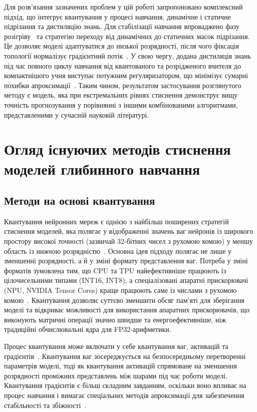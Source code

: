 \documentclass{pma-mthesis}
\begin{document}
Для розв’язання зазначених проблем у цій роботі запропоновано комплексний підхід, що інтегрує квантування у процесі навчання, динамічне і статичне підрізання та дистиляцію знань. Для стабілізації навчання впроваджено фазу розігріву~\cite{krishnamoorthi2018quantizing} та стратегію переходу від динамічних до статичних масок підрізання. Це дозволяє моделі адаптуватися до низької розрядності, після чого фіксація топології нормалізує градієнтний потік~\cite{10946020}. У свою чергу, додана дистиляція знань під час повного циклу навчання від квантованого та розрідженого вчителя до компактнішого учня виступає потужним регуляризатором, що мінімізує сумарні похибки апроксимації~\cite{kim2021pqk}. Таким чином, результатом застосування розглянутого методу є модель, яка при екстремальних рівнях стиснення демонструє вищу точність прогнозування у порівнянні з іншими комбінованими алгоритмами, представленими у сучасній науковій літературі.

\chapter{Огляд існуючих методів стиснення моделей глибинного навчання}

\section{Методи на основі квантування}

Квантування нейронних мереж є однією з найбільш поширених стратегій стиснення моделей, яка полягає у відображенні значень ваг нейронів із широкого простору високої точності (зазвичай 32-бітних чисел з рухомою комою) у меншу область із нижчою розрядністю~\cite{krishnamoorthi2018quantizing}. Основна ідея підходу полягає не лише у зменшенні розрядності, а й у зміні формату представлення ваг. Потреба у зміні форматів зумовлена тим, що CPU та TPU найефективніше працюють із цілочисельними типами (INT16, INT8), а спеціалізовані апаратні прискорювачі (NPU, NVIDIA Tensor Cores) краще працюють саме із числами з рухомою комою~\cite{gholami2022survey}. Квантування дозволяє суттєво зменшити обсяг пам’яті для зберігання моделі та відкриває можливості для використання апаратних прискорювачів, що виконують матричні операції значно швидше та енергоефективніше, ніж традиційні обчислювальні ядра для FP32-арифметики.

Процес квантування може включати у себе квантування ваг, активацій та градієнтів~\cite{krishnamoorthi2018quantizing}. Квантування ваг зосереджується на безпосередньому перетворенні параметрів моделі, тоді як квантування активацій спрямоване на зменшення розрядності проміжних представлень між шарами під час роботи моделі. Квантування градієнтів є більш складним завданням, оскільки воно впливає на процес навчання і вимагає спеціальних методів апроксимації для забезпечення стабільності та збіжності~\cite{nagel2021white}.
\end{document}
